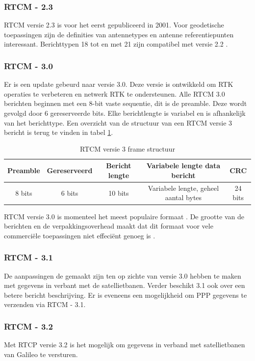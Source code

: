 \subsubsection{RTCM - 2.3}
RTCM versie 2.3 is voor het eerst gepubliceerd in 2001.  Voor geodetische toepassingen zijn de definities van antennetypes en antenne referentiepunten interessant. Berichttypen 18 tot en met 21 zijn compatibel met versie 2.2 \cite{LBibRTCM3}. 

\subsubsection{RTCM - 3.0}
Er is een update gebeurd naar versie 3.0. Deze versie is ontwikkeld om RTK operaties te verbeteren en netwerk RTK te ondersteunen. Alle RTCM 3.0 berichten beginnen met een 8-bit vaste sequentie, dit is de preamble. Deze wordt gevolgd door 6 gereserveerde bits. Elke berichtlengte is variabel en is afhankelijk van het berichttype. Een overzicht van de structuur van een RTCM versie 3 bericht is terug te vinden in tabel \ref{TabRTCM}.

\begin{table}[hbp]
	\caption{RTCM versie 3 frame structuur}		
	\begin{tabular}{|c|c|c|c|c|}	
		\hline
		Preamble & Gereserveerd & Bericht lengte & Variabele lengte data bericht & CRC \\ \hline
		8 bits & 6 bits & 10 bits & Variabele lengte, geheel aantal bytes & 24 bits \\ \hline
	\end{tabular}
	\label{TabRTCM}
\end{table}

RTCM versie 3.0 is momenteel het meest populaire formaat \cite{LBibRTCM}. De grootte van de berichten en de verpakkingsoverhead maakt dat dit formaat voor vele commerci\"ele toepassingen niet effeci\"ent genoeg is \cite{LBibDGPS}.  

\subsubsection{RTCM - 3.1}
De aanpassingen de gemaakt zijn ten op zichte van versie 3.0 hebben te maken met gegevens in verbant met de satellietbanen. Verder beschikt 3.1 ook over een betere bericht beschrijving. Er is eveneens een mogelijkheid om PPP gegevens te verzenden via RTCM - 3.1.

\subsubsection {RTCM - 3.2}
Met RTCP versie 3.2 is het mogelijk om gegevens in verband met satellietbanen van Galileo te versturen. 

